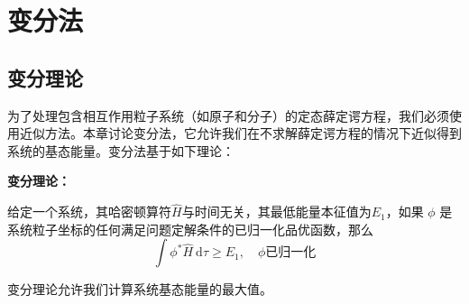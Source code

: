 \chapter{变分法}
\label{chap:8}
\section{变分理论}
\label{sec:8.1 The Variation Theorem}
    为了处理包含相互作用粒子系统（如原子和分子）的定态薛定谔方程，我们必须使用近似方法。本章讨论变分法，它允许我们在不求解薛定谔方程的情况下近似得到系统的基态能量。变分法基于如下理论：
    \begin{center}
        \parbox{0.8\textwidth}{
            \textbf{变分理论：}
            
            给定一个系统，其哈密顿算符$\hat{H}$与时间无关，其最低能量本征值为$E_1$，如果 $\phi$ 是系统粒子坐标的任何满足问题定解条件的已归一化品优函数，那么
            \begin{equation}
                \boxed{
                    \int \phi^{\ast}\hat{H}\:\mathrm{d}\tau \geq E_1, \quad \phi \text{已归一化}
                }
                \label{eq:8.1}
            \end{equation}
        }
    \end{center}

    变分理论允许我们计算系统基态能量的最大值。

